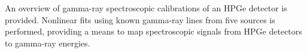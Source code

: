 An overview of gamma-ray spectroscopic calibrations of an HPGe detector is
provided. Nonlinear fits using known gamma-ray lines from five sources is
performed, providing a means to map spectroscopic signals from HPGe detectors to
gamma-ray energies.
